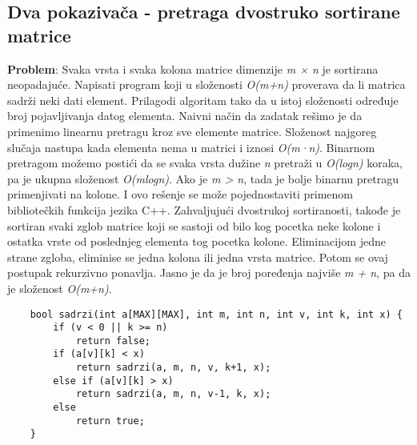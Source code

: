 \documentclass{article}
\begin{document}
\subsection{Dva pokazivača - pretraga dvostruko sortirane matrice}
\textbf{Problem}: Svaka vrsta i svaka kolona matrice dimenzije \textit{m × n} je sortirana
neopadajuće. Napisati program koji u složenosti \textit{O(m+n)} proverava da li
matrica sadrži neki dati element. Prilagodi algoritam tako da u istoj složenosti
određuje broj pojavljivanja datog elementa.
\newline
Naivni način da zadatak rešimo je da primenimo linearnu pretragu kroz sve
elemente matrice. Složenost najgoreg slučaja nastupa kada elementa nema u matrici i iznosi \textit{O(m·n)}. Binarnom pretragom možemo postići da se svaka vrsta dužine \textit{n} pretraži u \textit{O(logn)} koraka, pa je ukupna
složenost \textit{O(mlogn)}. Ako je \textit{m > n}, tada je bolje binarnu pretragu primenjivati
na kolone. I ovo rešenje se može pojednostaviti primenom bibliotečkih funkcija
jezika C++.
\newline
Zahvaljujući dvostrukoj sortiranosti, takođe je sortiran svaki zglob matrice koji
se sastoji od bilo kog pocetka neke kolone i ostatka vrste od poslednjeg elementa
tog pocetka kolone. Eliminacijom jedne strane zgloba, eliminise se jedna kolona ili jedna
vrsta matrice. Potom se ovaj postupak rekurzivno ponavlja. Jasno je da je broj poređenja najviše \textit{m + n}, pa da je složenost \textit{O(m+n)}.
\begin{lstlisting}
    bool sadrzi(int a[MAX][MAX], int m, int n, int v, int k, int x) {
        if (v < 0 || k >= n)
            return false;
        if (a[v][k] < x)
            return sadrzi(a, m, n, v, k+1, x);
        else if (a[v][k] > x)
            return sadrzi(a, m, n, v-1, k, x);
        else
            return true;
    }
\end{lstlisting}
\newpage
\end{document}

